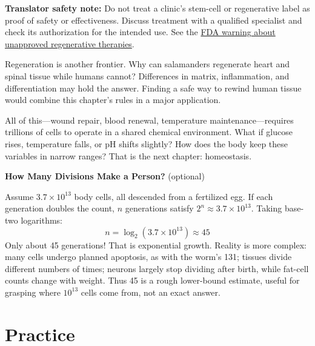 \textbf{Translator safety note:} Do not treat a clinic's stem-cell or regenerative label as proof of safety or effectiveness. Discuss treatment with a qualified specialist and check its authorization for the intended use. See the \href{https://www.fda.gov/vaccines-blood-biologics/consumers-biologics/important-patient-and-consumer-information-about-regenerative-medicine-therapies}{FDA warning about unapproved regenerative therapies}.

Regeneration is another frontier. Why can salamanders regenerate heart and spinal tissue while humans cannot? Differences in matrix, inflammation, and differentiation may hold the answer. Finding a safe way to rewind human tissue would combine this chapter's rules in a major application.

All of this---wound repair, blood renewal, temperature maintenance---requires trillions of cells to operate in a shared chemical environment. What if glucose rises, temperature falls, or pH shifts slightly? How does the body keep these variables in narrow ranges? That is the next chapter: homeostasis.

\begin{tiaozhan}
\textbf{How Many Divisions Make a Person?} (optional)

Assume $3.7\times 10^{13}$ body cells, all descended from a fertilized egg. If each generation doubles the count, $n$ generations satisfy $2^n \approx 3.7\times 10^{13}$. Taking base-two logarithms:
\[
n = \log_2(3.7\times 10^{13}) \approx 45
\]
Only about 45 generations! That is exponential growth. Reality is more complex: many cells undergo planned apoptosis, as with the worm's 131; tissues divide different numbers of times; neurons largely stop dividing after birth, while fat-cell counts change with weight. Thus 45 is a rough lower-bound estimate, useful for grasping where $10^{13}$ cells come from, not an exact answer.
\end{tiaozhan}

\section*{Practice}

